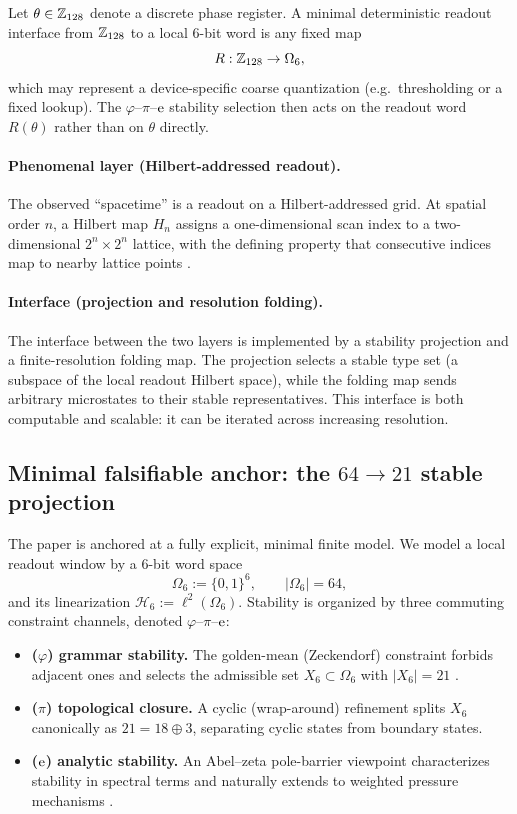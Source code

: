 \begin{definition}
\label{def:z128_interface}
Let $\theta\in\mathbb{Z}_{128}$ denote a discrete phase register.
A minimal deterministic readout interface from $\mathbb{Z}_{128}$ to a local $6$-bit word is any fixed map
\[
R:\mathbb{Z}_{128}\to \Omega_6,
\]
which may represent a device-specific coarse quantization (e.g.\ thresholding or a fixed lookup).
The $\varphi$--$\pi$--$\mathrm{e}$ stability selection then acts on the readout word $R(\theta)$ rather than on $\theta$ directly.
\end{definition}

\paragraph{Phenomenal layer (Hilbert-addressed readout).}
The observed ``spacetime'' is a readout on a Hilbert-addressed grid.
At spatial order $n$, a Hilbert map $H_n$ assigns a one-dimensional scan index to a two-dimensional $2^n\times 2^n$ lattice, with the defining property that consecutive indices map to nearby lattice points \cite{Hilbert1891,Sagan1994}.

\paragraph{Interface (projection and resolution folding).}
The interface between the two layers is implemented by a stability projection and a finite-resolution folding map.
The projection selects a stable type set (a subspace of the local readout Hilbert space), while the folding map sends arbitrary microstates to their stable representatives.
This interface is both computable and scalable: it can be iterated across increasing resolution.

\subsection{Minimal falsifiable anchor: the \texorpdfstring{$64\to 21$}{64->21} stable projection}
\label{subsec:intro_minimal}

The paper is anchored at a fully explicit, minimal finite model.
We model a local readout window by a $6$-bit word space
\[
\Omega_6:=\{0,1\}^6,\qquad |\Omega_6|=64,
\]
and its linearization $\mathcal{H}_6:=\ell^2(\Omega_6)$.
Stability is organized by three commuting constraint channels, denoted $\varphi$--$\pi$--$\mathrm{e}$:
\begin{itemize}
\item \textbf{($\varphi$) grammar stability.} The golden-mean (Zeckendorf) constraint forbids adjacent ones and selects the admissible set $X_6\subset\Omega_6$ with $|X_6|=21$ \cite{Zeckendorf1972,LindMarcus1995}.
\item \textbf{($\pi$) topological closure.} A cyclic (wrap-around) refinement splits $X_6$ canonically as $21=18\oplus 3$, separating cyclic states from boundary states.
\item \textbf{($\mathrm{e}$) analytic stability.} An Abel--zeta pole-barrier viewpoint characterizes stability in spectral terms and naturally extends to weighted pressure mechanisms \cite{Ruelle1978,ParryPollicott1990}.
\end{itemize}

